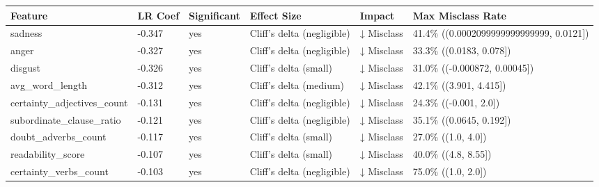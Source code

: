\begin{tabular}{llllll}
\toprule
Feature & LR Coef & Significant & Effect Size & Impact & Max Misclass Rate \\
\midrule
sadness & -0.347 & yes & Cliff's delta (negligible) & ↓ Misclass & 41.4\% ((0.0002099999999999999, 0.0121]) \\
anger & -0.327 & yes & Cliff's delta (negligible) & ↓ Misclass & 33.3\% ((0.0183, 0.078]) \\
disgust & -0.326 & yes & Cliff's delta (small) & ↓ Misclass & 31.0\% ((-0.000872, 0.00045]) \\
avg\_word\_length & -0.312 & yes & Cliff's delta (medium) & ↓ Misclass & 42.1\% ((3.901, 4.415]) \\
certainty\_adjectives\_count & -0.131 & yes & Cliff's delta (negligible) & ↓ Misclass & 24.3\% ((-0.001, 2.0]) \\
subordinate\_clause\_ratio & -0.121 & yes & Cliff's delta (negligible) & ↓ Misclass & 35.1\% ((0.0645, 0.192]) \\
doubt\_adverbs\_count & -0.117 & yes & Cliff's delta (small) & ↓ Misclass & 27.0\% ((1.0, 4.0]) \\
readability\_score & -0.107 & yes & Cliff's delta (small) & ↓ Misclass & 40.0\% ((4.8, 8.55]) \\
certainty\_verbs\_count & -0.103 & yes & Cliff's delta (negligible) & ↓ Misclass & 75.0\% ((1.0, 2.0]) \\
\bottomrule
\end{tabular}
